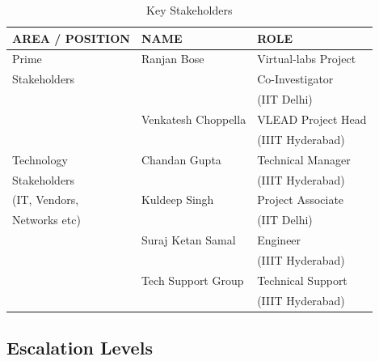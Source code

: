 \documentclass[11pt]{article}
\begin{document}
\begin{table}[H]
\caption{\label{tbl:Key Stakeholders}Key Stakeholders}
\begin{center}
\begin{tabular}{lll}
\hline
 AREA / POSITION  &  NAME                 &  ROLE                  \\
\hline
 Prime            &  Ranjan Bose          &  Virtual-labs Project  \\
 Stakeholders     &                       &  Co-Investigator       \\
                  &                       &  (IIT Delhi)           \\
                  &  Venkatesh Choppella  &  VLEAD Project Head    \\
                  &                       &  (IIIT Hyderabad)      \\
\hline
 Technology       &  Chandan Gupta        &  Technical Manager     \\
 Stakeholders     &                       &  (IIIT Hyderabad)      \\
 (IT, Vendors,    &  Kuldeep Singh        &  Project Associate     \\
 Networks etc)    &                       &  (IIT Delhi)           \\
                  &  Suraj Ketan Samal    &  Engineer              \\
                  &                       &  (IIIT Hyderabad)      \\
                  &  Tech Support Group   &  Technical Support     \\
                  &                       &  (IIIT Hyderabad)      \\
\hline
\end{tabular}
\end{center}
\end{table}

\subsection{Escalation Levels}
\label{sec-5.2}
\end{document}
